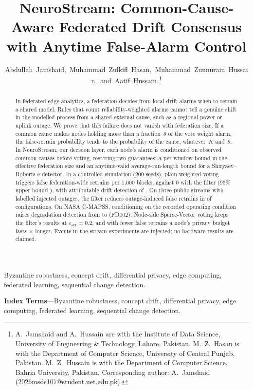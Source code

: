 \IfFileExists{IEEEtran.cls}{\documentclass[journal]{IEEEtran}\newcommand{\ieeemode}{}}{\documentclass[10pt,twocolumn,letterpaper]{article}\usepackage[margin=0.72in,columnsep=0.22in]{geometry}}
\begin{document}
\title{NeuroStream: Common-Cause-Aware Federated Drift Consensus with Anytime False-Alarm Control}
\author{Abdullah~Jamshaid,~Muhammad~Zulkifl~Hasan,~Muhammad~Zunnurain~Hussain,~and~Aatif~Hussain%
\thanks{A.~Jamshaid and A.~Hussain are with the Institute of Data Science, University of Engineering \& Technology, Lahore, Pakistan. M.~Z.~Hasan is with the Department of Computer Science, University of Central Punjab, Pakistan. M.~Z.~Hussain is with the Department of Computer Science, Bahria University, Pakistan. Corresponding author: A.~Jamshaid (2026msds107@student.uet.edu.pk).}}
\maketitle

\begin{abstract}
In federated edge analytics, a federation decides from local drift alarms when to retrain a shared model. Rules that count reliability-weighted alarms cannot tell a genuine shift in the modelled process from a shared external cause, such as a regional power or uplink outage. We prove that this failure does not vanish with federation size. If a common cause makes nodes holding more than a fraction~$\theta$ of the vote weight alarm, the false-retrain probability tends to the probability of the cause, whatever~$K$ and~$\theta$. In NeuroStream, our decision layer, each node's alarm is conditioned on observed common causes before voting, restoring two guarantees: a per-window bound in the effective federation size and an anytime-valid average-run-length bound for a Shiryaev--Roberts e-detector. In a controlled simulation (200 seeds), plain weighted voting triggers \SfdcFE{} false federation-wide retrains per 1,000 blocks, against 0 with the filter (95\% upper bound \SfilUCB), with attributable drift detection of \SfilDet. On three public streams with labelled injected outages, the filter reduces outage-induced false retrains in \AnLower{} of \AnSettings{} configurations. On NASA C-MAPSS, conditioning on the recorded operating condition raises degradation detection from \CmRawDetTwo{} to \CmAdjDetTwo{} (FD002). Node-side Sparse-Vector voting keeps the filter's results at $\varepsilon_{\mathrm{svt}}=0.2$, and with fewer false retrains a node's privacy budget lasts \HorRatio$\times$ longer. Events in the stream experiments are injected; no hardware results are claimed.
\end{abstract}
\ifdefined\ieeemode
\begin{IEEEkeywords}
Byzantine robustness, concept drift, differential privacy, edge computing, federated learning, sequential change detection.
\end{IEEEkeywords}
\else
\noindent\textbf{Index Terms}---Byzantine robustness, concept drift, differential privacy, edge computing, federated learning, sequential change detection.
\fi
\end{document}
